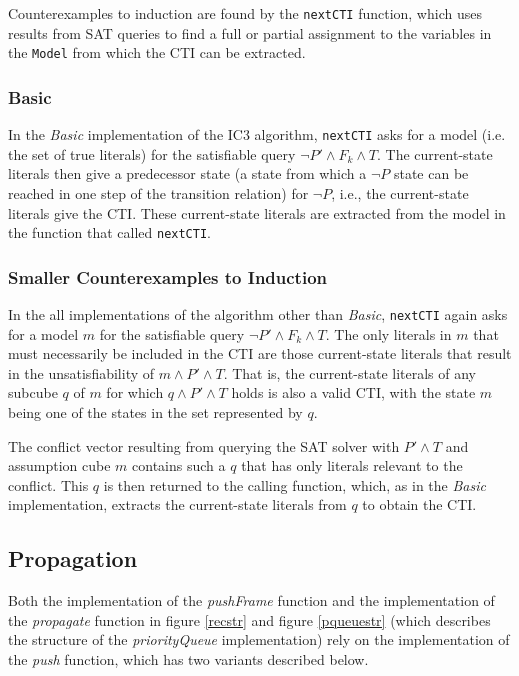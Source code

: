 \documentclass[12pt,a4paper,twoside,openright]{report}
\begin{document}
{Counterexamples to induction are found by the \verb,nextCTI, function, which
uses results from SAT queries to find a full or partial assignment to
the variables in the \verb,Model, from which the CTI can be extracted.

\subsubsection{Basic}
In the \emph{Basic} implementation of the IC3 algorithm, \verb,nextCTI, asks for a model
(i.e. the set of true literals) for the satisfiable query $\neg P' \wedge F_k \wedge T$.
The current-state literals then give a predecessor state (a state from which
a $\neg P$ state can be reached in one step of the transition relation) for $\neg P$,
i.e., the current-state literals give the CTI.
These current-state literals are extracted from the model in the function that
called \verb,nextCTI,.

\subsubsection{Smaller Counterexamples to Induction}
In the all implementations of the algorithm other than {\it Basic},
\verb,nextCTI, again asks for a model $m$
for the satisfiable query $\neg P' \wedge F_k \wedge T$. The only literals in $m$ that
must necessarily be included in the CTI are those current-state literals that result in
the unsatisfiability of $m \wedge P' \wedge T$. That is, the current-state literals of any
subcube $q$ of $m$ for which $q \wedge P' \wedge T$ holds is also a valid CTI, with
the state $m$ being one of the states in the set represented by $q$.

The conflict vector resulting from querying the SAT solver with $P' \wedge T$ and assumption
cube $m$ contains such a $q$ that has only literals relevant to the conflict. This $q$ is
then returned to the calling function, which, as in the \emph{Basic} implementation, extracts
the current-state literals from $q$ to obtain the CTI.


\subsection{Propagation}

Both the implementation of the {\it pushFrame} function and the implementation of the
{\it propagate} function in figure \ref{recstr} and figure \ref{pqueuestr} (which
describes the structure of the {\it priorityQueue} implementation)
rely on the implementation of the
{\it push} function, which has two variants described below.

}
\end{document}
